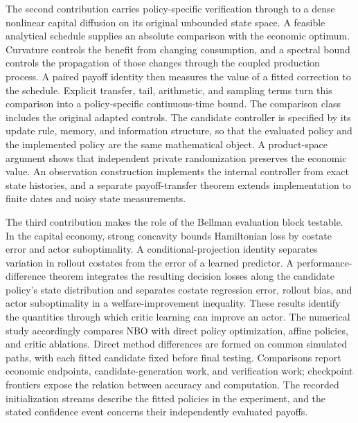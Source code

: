 The second contribution carries policy-specific verification through to a dense nonlinear capital diffusion on its original unbounded state space. A feasible analytical schedule supplies an absolute comparison with the economic optimum. Curvature controls the benefit from changing consumption, and a spectral bound controls the propagation of those changes through the coupled production process. A paired payoff identity then measures the value of a fitted correction to the schedule. Explicit transfer, tail, arithmetic, and sampling terms turn this comparison into a policy-specific continuous-time bound. The comparison class includes the original adapted controls. The candidate controller is specified by its update rule, memory, and information structure, so that the evaluated policy and the implemented policy are the same mathematical object. A product-space argument shows that independent private randomization preserves the economic value. An observation construction implements the internal controller from exact state histories, and a separate payoff-transfer theorem extends implementation to finite dates and noisy state measurements.

The third contribution makes the role of the Bellman evaluation block testable. In the capital economy, strong concavity bounds Hamiltonian loss by costate error and actor suboptimality. A conditional-projection identity separates variation in rollout costates from the error of a learned predictor. A performance-difference theorem integrates the resulting decision losses along the candidate policy's state distribution and separates costate regression error, rollout bias, and actor suboptimality in a welfare-improvement inequality. These results identify the quantities through which critic learning can improve an actor. The numerical study accordingly compares NBO with direct policy optimization, affine policies, and critic ablations. Direct method differences are formed on common simulated paths, with each fitted candidate fixed before final testing. Comparisons report economic endpoints, candidate-generation work, and verification work; checkpoint frontiers expose the relation between accuracy and computation. The recorded initialization streams describe the fitted policies in the experiment, and the stated confidence event concerns their independently evaluated payoffs.

